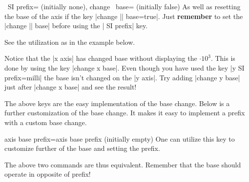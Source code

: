 \begin{pgfplotsxykeylist}{\x\ SI prefix= (initially none),
      change \x\ base= (initially false)}
  As well as resetting the base of the axis if the key |change || base=true|. Just \textbf{remember} to
  set the |change || base| before using the | SI prefix| key.

  See the utilization as in the example below.
\begin{codeexample}[]
\end{codeexample}
  Notice that the |x axis| has changed base without displaying the $\cdot 10^{3}$. This is done by using the key |change x base|. Even though you have used
  the key |y SI prefix=milli| the base isn't changed on the |y axis|. Try adding |change y base| just after |change x base| and see the result!
\end{pgfplotsxykeylist}

The above keys are the easy implementation of the base change. Below is a further customization of the base change. It makes it easy to implement a prefix
with a custom base change.

\begin{pgfplotskey}{axis base prefix={axis  base  prefix } (initially empty)}
  One can utilize this key to customize further of the base and setting the prefix.
\begin{codeexample}
\pgfplotsset{change x base,x SI prefix=kilo}
\end{codeexample}
  The above two commands are thus equivalent. Remember that the base should operate in opposite of prefix!
\end{pgfplotskey}
\endgroup
